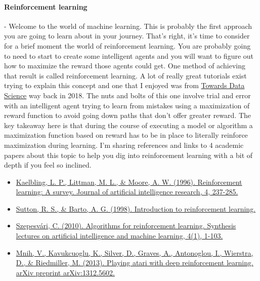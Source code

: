 \documentclass{article}
\begin{document}
\paragraph{Reinforcement learning} - Welcome to the world of machine learning. This is probably the first approach you are going to learn about in your journey. That’s right, it's time to consider for a brief moment the world of reinforcement learning. You are probably going to need to start to create some intelligent agents and you will want to figure out how to maximize the reward those agents could get. One method of achieving that result is called reinforcement learning. A lot of really great tutorials exist trying to explain this concept and one that I enjoyed was from \href{https://towardsdatascience.com/reinforcement-learning-101-e24b50e1d292}{Towards Data Science} way back in 2018. The nuts and bolts of this one involve trial and error with an intelligent agent trying to learn from mistakes using a maximization of reward function to avoid going down paths that don’t offer greater reward. The key takeaway here is that during the course of executing a model or algorithm a maximization function based on reward has to be in place to literally reinforce maximization during learning. I’m sharing references and links to 4 academic papers about this topic to help you dig into reinforcement learning with a bit of depth if you feel so inclined. 

\begin{itemize}
\item \href{https://www.jair.org/index.php/jair/article/view/10166/24110}{Kaelbling, L. P., Littman, M. L., \& Moore, A. W. (1996). Reinforcement learning: A survey. Journal of artificial intelligence research, 4, 237-285.} \cite{kaelbling1996reinforcement}
\item \href{https://login.cs.utexas.edu/sites/default/files/legacy_files/research/documents/1 intro up to RL:TD.pdf}{Sutton, R. S., \& Barto, A. G. (1998). Introduction to reinforcement learning.} \cite{sutton1998introduction}
\item \href{https://citeseerx.ist.psu.edu/viewdoc/download?doi=10.1.1.308.549&rep=rep1&type=pdf}{Szepesvári, C. (2010). Algorithms for reinforcement learning. Synthesis lectures on artificial intelligence and machine learning, 4(1), 1-103.} \cite{szepesvari2010algorithms}
\item \href{https://arxiv.org/pdf/1312.5602.pdf }{Mnih, V., Kavukcuoglu, K., Silver, D., Graves, A., Antonoglou, I., Wierstra, D., \& Riedmiller, M. (2013). Playing atari with deep reinforcement learning. arXiv preprint arXiv:1312.5602.} \cite{mnih2013playing}
\end{itemize}
\end{document}

